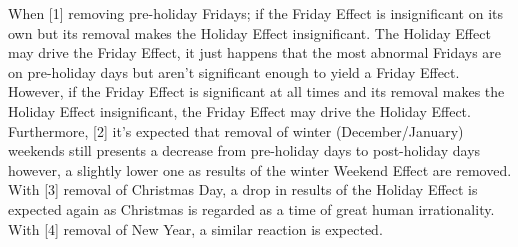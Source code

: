 \documentclass[11pt, english]{article}
\begin{document}
		When [1] removing pre-holiday Fridays; if the Friday Effect is insignificant on its own but its removal makes the Holiday Effect insignificant. The Holiday Effect may drive the Friday Effect, it just happens that the most abnormal Fridays are on pre-holiday days but aren’t significant enough to yield a Friday Effect. However, if the Friday Effect is significant at all times and its removal makes the Holiday Effect insignificant, the Friday Effect may drive the Holiday Effect. Furthermore, [2] it’s expected that removal of winter (December/January) weekends still presents a decrease from pre-holiday days to post-holiday days however, a slightly lower one as results of the winter Weekend Effect are removed. With [3] removal of Christmas Day, a drop in results of the Holiday Effect is expected again as Christmas is regarded as a time of great human irrationality. With [4] removal of New Year, a similar reaction is expected.

	\newpage 
\end{document}
